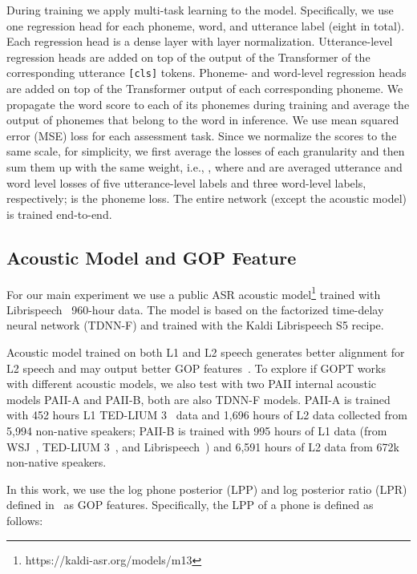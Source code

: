 \documentclass{article}
\begin{document}
During training we apply multi-task learning to the model. Specifically, we use one regression head for each phoneme, word, and utterance label (eight in total). Each regression head is a  dense layer with layer normalization. Utterance-level regression heads are added on top of the output of the Transformer of the corresponding utterance \texttt{[cls]} tokens. Phoneme- and word-level regression heads are added on top of the Transformer output of each corresponding phoneme. We propagate the word score to each of its phonemes during training and average the output of phonemes that belong to the word in inference. We use mean squared error (MSE) loss for each assessment task. Since we normalize the scores to the same scale, for simplicity, we first average the losses of each granularity and then sum them up with the same weight, i.e., , where  and  are averaged utterance and word level losses of five utterance-level labels and three word-level labels, respectively;  is the phoneme loss. The entire network (except the acoustic model) is trained end-to-end. 



\subsection{Acoustic Model and GOP Feature}
\label{sec:am}

For our main experiment we use a public ASR acoustic model\footnote{https://kaldi-asr.org/models/m13} trained with Librispeech~\cite{panayotov2015librispeech} 960-hour data. The model is based on the factorized time-delay neural network (TDNN-F) and trained with the Kaldi Librispeech S5 recipe. 

Acoustic model trained on both L1 and L2 speech generates better alignment for L2 speech and may output better GOP features~\cite{tu2018investigating}. To explore if GOPT works with different acoustic models, we also test with two PAII internal acoustic models PAII-A and PAII-B, both are also TDNN-F models. PAII-A is trained with 452 hours L1 TED-LIUM 3~\cite{hernandez2018ted} data and 1,696 hours of L2 data collected from 5,994 non-native speakers; PAII-B is trained with 995 hours of L1 data (from WSJ~\cite{marcus1993building}, TED-LIUM 3~\cite{hernandez2018ted}, and Librispeech~\cite{panayotov2015librispeech}) and 6,591 hours of L2 data from 672k non-native speakers.



In this work, we use the log phone posterior (LPP) and log posterior ratio (LPR) defined in~\cite{hu2015improved} as GOP features. Specifically, the LPP of a phone  is defined as follows:
\end{document}
